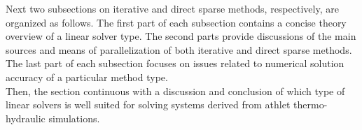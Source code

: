 
Next two subsections on iterative and direct sparse methods, respectively, are organized as follows. The first part of each subsection contains a concise theory overview of a linear solver type. The second parts provide discussions of the main sources and means of parallelization of both iterative and direct sparse methods. The last part of each subsection focuses on issues related to numerical solution accuracy of a particular method type. \\

Then, the section continuous with a discussion and conclusion of which type of linear solvers is well suited for solving  systems derived from \acrshort{athlet} thermo-hydraulic simulations. \\
